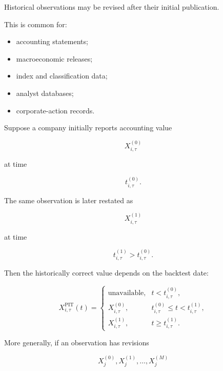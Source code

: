 \documentclass[11pt,a4paper]{article}
\begin{document}
Historical observations may be revised after their initial publication.

This is common for:

\begin{itemize}
    \item accounting statements;
    \item macroeconomic releases;
    \item index and classification data;
    \item analyst databases;
    \item corporate-action records.
\end{itemize}

Suppose a company initially reports accounting value

\begin{equation}
X_{i,\tau}^{(0)}
\end{equation}

at time

\begin{equation}
t_{i,\tau}^{(0)}.
\end{equation}

The same observation is later restated as

\begin{equation}
X_{i,\tau}^{(1)}
\end{equation}

at time

\begin{equation}
t_{i,\tau}^{(1)}
>
t_{i,\tau}^{(0)}.
\end{equation}

Then the historically correct value depends on the backtest date:

\begin{equation}
X_{i,\tau}^{\mathrm{PIT}}(t)
=
\begin{cases}
\text{unavailable},
&
t<t_{i,\tau}^{(0)},
\\[0.2cm]
X_{i,\tau}^{(0)},
&
t_{i,\tau}^{(0)}
\leq
t
<
t_{i,\tau}^{(1)},
\\[0.2cm]
X_{i,\tau}^{(1)},
&
t
\geq
t_{i,\tau}^{(1)}.
\end{cases}
\end{equation}

More generally, if an observation has revisions

\begin{equation}
X_j^{(0)},
X_j^{(1)},
\ldots,
X_j^{(M)}
\end{equation}
\end{document}
